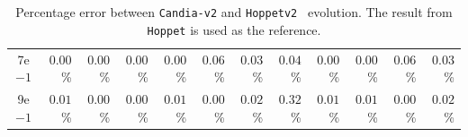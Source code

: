 \begin{table}[htp]
\begin{center}
\begin{tabular}{||c||r|r|r|r|r|r|r|r|r|r|r|}
 7e$-1$ & $0.00$\% & $0.00$\% & $0.00$\% & $0.00$\% & $0.06$\% & $0.03$\% & $0.04$\% & $0.00$\% & $0.00$\% & $0.06$\% & $0.03$\% \\
 9e$-1$ & $0.01$\% & $0.00$\% & $0.00$\% & $0.01$\% & $0.00$\% & $0.02$\% & $0.32$\% & $0.01$\% & $0.01$\% & $0.00$\% & $0.02$\% \\
\hline \hline
\end{tabular}
\end{center}
\caption{Percentage error between \texttt{Candia-v2} and \texttt{Hoppetv2}~\cite{Karlberg:2025hxk} evolution. The result from \texttt{Hoppet} is used as the reference.}
\label{tbl:hoppet-comparison}
\end{table}
